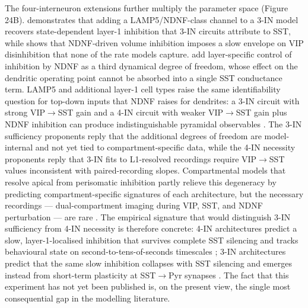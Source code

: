 \documentclass[11pt]{article}
\let\origrightarrow\rightarrow
\def\rightarrow{\ensuremath{\origrightarrow}}
\begin{document}
The four-interneuron extensions further multiply the parameter space (Figure 24B). \citep{Iqbal2025} demonstrates that adding a LAMP5/NDNF-class channel to a 3-IN model recovers state-dependent layer-1 inhibition that 3-IN circuits attribute to SST, while \citep{Hartung2024} shows that NDNF-driven volume inhibition imposes a slow envelope on VIP disinhibition that none of the rate models capture. \citet{Vighagen2021} add layer-specific control of inhibition by NDNF as a third dynamical degree of freedom, whose effect on the dendritic operating point cannot be absorbed into a single SST conductance term. LAMP5 and additional layer-1 cell types \citep{Anastasiades2021a, Vanderveer2021} raise the same identifiability question for top-down inputs that NDNF raises for dendrites: a 3-IN circuit with strong VIP\rightarrow SST gain and a 4-IN circuit with weaker VIP\rightarrow SST gain plus NDNF inhibition can produce indistinguishable pyramidal observables \citep{Iqbal2025, Hartung2024, Vighagen2021, Reimann2026}. The 3-IN sufficiency proponents \citep{Hertag2019, Litwinkumar2016, Bos2025} reply that the additional degrees of freedom are model-internal and not yet tied to compartment-specific data, while the 4-IN necessity proponents \citep{Hartung2024, Vighagen2021} reply that 3-IN fits to L1-resolved recordings require VIP\rightarrow SST values inconsistent with paired-recording slopes. Compartmental models that resolve apical from perisomatic inhibition \citep{Jadi2012, Reimann2026, Dorsett2021} partly relieve this degeneracy by predicting compartment-specific signatures of each architecture, but the necessary recordings --- dual-compartment imaging during VIP, SST, and NDNF perturbation --- are rare \citep{Bilash2023, Lenkey2025, Anastasiades2021a}. The empirical signature that would distinguish 3-IN sufficiency from 4-IN necessity is therefore concrete: 4-IN architectures predict a slow, layer-1-localised inhibition that survives complete SST silencing and tracks behavioural state on second-to-tens-of-seconds timescales \citep{Hartung2024, Vighagen2021}; 3-IN architectures predict that the same slow inhibition collapses with SST silencing and emerges instead from short-term plasticity at SST\rightarrow Pyr synapses \citep{Hertag2019, Litwinkumar2016}. The fact that this experiment has not yet been published is, on the present view, the single most consequential gap in the modelling literature.
\end{document}
